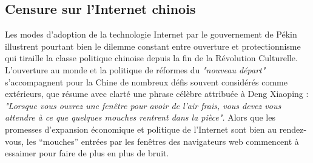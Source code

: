 \subsection[Censure sur l’Internet chinois]{Censure sur l’Internet chinois}
Les modes d’adoption de la technologie Internet par le gouvernement de Pékin illustrent pourtant bien le dilemme constant entre ouverture et protectionnisme qui tiraille la classe politique chinoise depuis la fin de la Révolution Culturelle. L’ouverture au monde et la politique de réformes du \textit{"nouveau départ"} s’accompagnent pour la Chine de nombreux défis souvent considérés comme extérieurs, que résume avec clarté une phrase célèbre attribuée à Deng Xiaoping : \textit{"Lorsque vous ouvrez une fenêtre pour avoir de l’air frais, vous devez vous attendre à ce que quelques mouches rentrent dans la pièce".} Alors que les promesses d’expansion économique et politique de l’Internet sont bien au rendez-vous, les “mouches” entrées par les fenêtres des navigateurs web commencent à essaimer pour faire de plus en plus de bruit.

